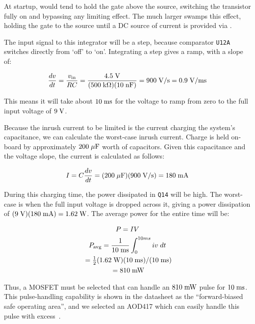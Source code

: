 At startup,  would tend to hold the gate above the source,
switching the transistor fully on and bypassing any limiting effect. The
much larger  swamps this effect, holding the gate to the
source until a DC source of current is provided via .

The input signal to this integrator will be a step, because comparator
\texttt{U12A} switches directly from `off' to `on'. Integrating a step gives
a ramp, with a slope of:

\begin{equation*}
    \frac{dv}{dt} = \frac{v_{\mathrm{in}}}{RC} = \frac{4.5\;\mathrm{V}}{(500\;\mathrm{k\Omega})(10\;\mathrm{nF})}
    = 900\;\mathrm{V/s} = 0.9\;\mathrm{V/ms}
\end{equation*}

This means it will take about $10\;\mathrm{ms}$ for the voltage to ramp from zero
to the full input voltage of $9\;\mathrm{V}$.

Because the inrush current to be limited is the current charging the system's
capacitance, we can calculate the worst-case inrush current. Charge is held
on-board by approximately $200\;\mathrm{\mu F}$ worth of capacitors. Given this
capacitance and the voltage slope, the current is calculated as follows:

\begin{equation*}
    I = C \frac{dv}{dt} = (200\;\mathrm{\mu F})(900\;\mathrm{V/s}) = 180\;\mathrm{mA}
\end{equation*}

During this charging time, the power dissipated in \texttt{Q14} will be high.
The worst-case is when the full input voltage is dropped across it, giving
a power dissipation of $(9\;\mathrm{V})(180\;\mathrm{mA}) = 1.62\;\mathrm{W}$. The average
power for the entire time will be:

\begin{gather*}
    P = IV \\
    P_{\mathrm{avg}} = \frac{1}{10\;\mathrm{ms}}\int_0^{10ms} iv\;dt \\
    {}= \tfrac{1}{2}(1.62\;\mathrm{W})(10\;\mathrm{ms})/(10\;\mathrm{ms}) \\
    {}= 810\;\mathrm{mW} \\
\end{gather*}

Thus, a MOSFET must be selected that can handle an $810\;\mathrm{mW}$ pulse for
$10\;\mathrm{ms}$. This pulse-handling capability is shown in the datasheet as
the ``forward-biased safe operating area'', and we selected an AOD417 which
can easily handle this pulse with excess~\cite{aod417}.

